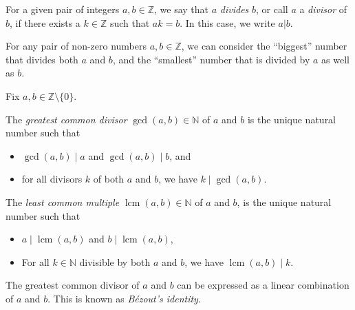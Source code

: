 \documentclass[a4paper, oneside, 12pt]{amsart}
\DeclareMathOperator{\lcm}{lcm}
\begin{document}
\begin{definition}\label{def:division-in-Z}
  For a given pair of integers \( a, b \in \mathbb{Z} \), we say that \( a \) \emph{divides} \( b \), or call \(a\) a \emph{divisor} of \(b\), if there exists a \( k \in \mathbb{Z} \) such that \( a k = b \).
  In this case,  we write \(a|b\).
\end{definition}


For any pair of non-zero numbers \(a,b \in \mathbb{Z}\), we can consider the ``biggest'' number that divides both \(a\) and \(b\), and the ``smallest'' number that is divided by \(a\) as well as \(b\).

\begin{definition}\label{def:gcd}
  Fix \( a, b \in \mathbb{Z} \setminus \{0\} \).
  \begin{thmlist}
    \item The \emph{greatest common divisor} \(\gcd(a,b)\in \mathbb{N}\) of \( a \) and \( b \) is the unique natural number such that
    \begin{itemize}
      \item \( \gcd(a, b) \mid a \) and \( \gcd(a, b) \mid b \), and
      \item for all divisors \( k \) of both \( a \) and \( b \), we have \( k \mid \gcd(a, b) \).
    \end{itemize}
    \item The \emph{least common multiple} \(\lcm(a,b) \in \mathbb{N}\) of \( a \) and \( b \), is the unique natural number such that
    \begin{itemize}
      \item \( a \mid \lcm(a, b) \) and \( b \mid \lcm(a, b) \),
      \item For all \( k \in \mathbb{N} \) divisible by both \( a \) and \( b \), we have \( \lcm(a, b) \mid k \).
    \end{itemize}
  \end{thmlist}
\end{definition}

The greatest common divisor of \( a \) and \( b \) can be expressed as a linear combination of \( a \) and \( b \).
This is known as \emph{Bézout's identity}.
\end{document}
